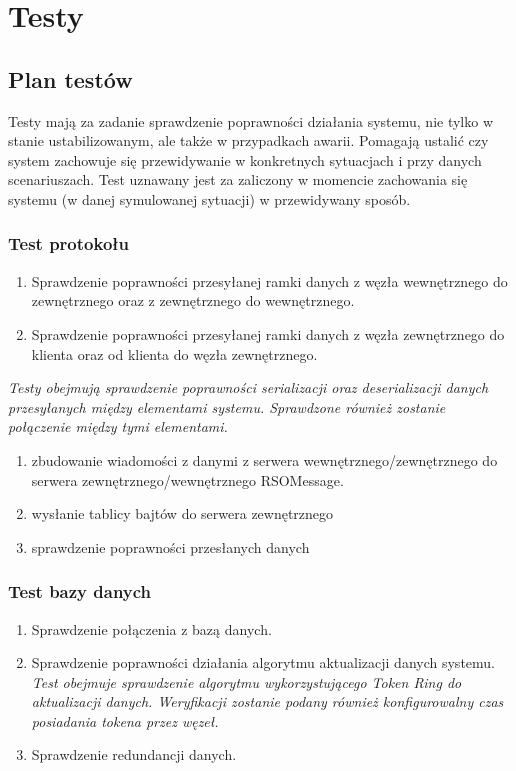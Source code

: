 \chapter{Testy}

\section{Plan testów}

Testy mają za zadanie sprawdzenie poprawności działania systemu, nie tylko w stanie ustabilizowanym, ale także w przypadkach awarii. Pomagają ustalić czy system zachowuje się przewidywanie w konkretnych sytuacjach i przy danych scenariuszach. Test uznawany jest za zaliczony w momencie zachowania się systemu (w danej symulowanej sytuacji) w przewidywany sposób.

\subsection[Test protokołu]{Test protokołu}
\begin{enumerate}
\item Sprawdzenie poprawności przesyłanej ramki danych z węzła wewnętrznego do zewnętrznego oraz z zewnętrznego do wewnętrznego.
\item Sprawdzenie poprawności przesyłanej ramki danych z węzła zewnętrznego do klienta oraz od klienta do węzła zewnętrznego.
\end{enumerate}
	
\textit{Testy obejmują sprawdzenie poprawności serializacji oraz deserializacji danych przesyłanych między elementami systemu. Sprawdzone również zostanie połączenie między tymi elementami.}

\begin{enumerate}
\item zbudowanie wiadomości z danymi z serwera wewnętrznego/zewnętrznego do serwera zewnętrznego/wewnętrznego RSOMessage.
\item wysłanie tablicy bajtów do serwera zewnętrznego 
\item sprawdzenie poprawności przesłanych danych
\end{enumerate}


\subsection[Test bazy danych]{Test bazy danych}
\begin{enumerate}
\item Sprawdzenie połączenia z bazą danych.
\item Sprawdzenie poprawności działania algorytmu aktualizacji danych systemu. \\
\textit{Test obejmuje sprawdzenie algorytmu wykorzystującego Token Ring do aktualizacji danych. Weryfikacji zostanie podany również konfigurowalny czas posiadania tokena przez węzeł.}
\item Sprawdzenie redundancji danych.
\end{enumerate}

